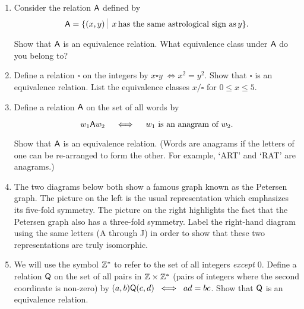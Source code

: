 \begin{enumerate}
\item Consider the relation $\mbox{\textsf A}$ defined by 
\[ \relA = \{ (x,y) \suchthat \; x \, \mbox{has the same astrological sign as} \, y \}. \]

\noindent Show that $\mbox{\textsf A}$ is an equivalence relation.  What equivalence class
under $\mbox{\textsf A}$ do you belong to?

\wbvfill

\workbookpagebreak

\item Define a relation $\square$ on the integers by $x \square y \; \iff x^2 = y^2$.  Show that $\square$ is an equivalence relation.  List the equivalence
classes $x/\square$ for $0 \leq x \leq 5$.

\wbvfill


\item Define a relation $\mbox{\textsf A}$ on the set of all words by

\[ w_1 \mbox{\textsf A} w_2 \quad \iff \quad w_1 \mbox{ is an anagram of } w_2. \]

\noindent Show that $\mbox{\textsf A}$ is an equivalence relation.  (Words are anagrams
if the letters of one can be re-arranged to form the other.  For example, `ART' and `RAT' are anagrams.)

\wbvfill

\workbookpagebreak

\item The two diagrams below both show a famous graph known as the 
Petersen graph.  The picture on the 
left is the usual representation which emphasizes its five-fold symmetry.  The picture on the right
highlights the fact that the Petersen graph also has a three-fold symmetry.  Label the right-hand diagram
using the same letters (A through J) in order to show that these two representations are truly isomorphic.

\vspace{.2in}

\rule{0pt}{0pt} \hspace{-.75in} 

\vspace{.2in}

\item We will use the symbol ${\mathbb Z}^{\ast}$ to refer to the set of
all integers \emph{except} $0$.  
Define a relation $\mbox{\textsf Q}$ on the set of all pairs in ${\mathbb Z} \times {\mathbb Z}^{\ast}$ (pairs of integers where the second coordinate is non-zero) by
$(a,b) \mbox{\textsf Q} (c,d) \; \iff \; ad=bc$.  Show that $\mbox{\textsf Q}$ is an 
equivalence relation.


\end{enumerate}
